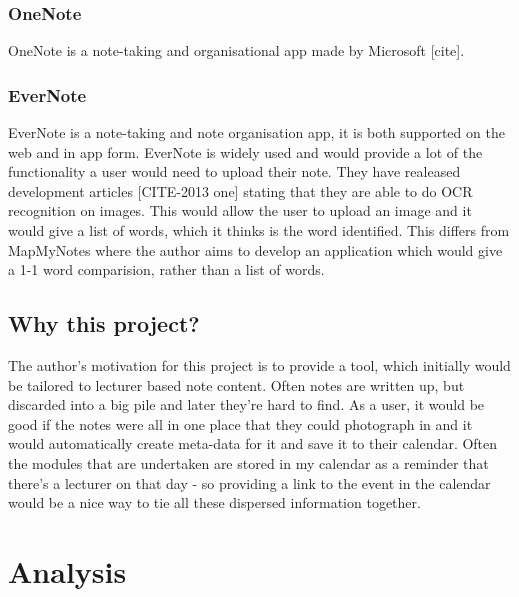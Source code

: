 \subsubsection{OneNote}
OneNote is a note-taking and organisational app made by Microsoft [cite].
\subsubsection{EverNote}
EverNote is a note-taking and note organisation app, it is both supported on the web and in app form. EverNote is widely used and would provide a lot of the functionality a user would need to upload their note. They have realeased development articles [CITE-2013 one] stating that they are able to do OCR recognition on images. This would allow the user to upload an image and it would give a list of words, which it thinks is the word identified. This differs from MapMyNotes where the author aims to develop an application which would give a 1-1 word comparision, rather than a list of words.


\subsection{Why this project?}
The author's motivation for this project is to provide a tool, which initially would be tailored to lecturer based note content. Often notes are written up, but discarded into a big pile and later they're hard to find. As a user, it would be good if the notes were all in one place that they could photograph in and it would automatically create meta-data for it and save it to their calendar. Often the modules that are undertaken are stored in my calendar as a reminder that there's a lecturer on that day - so providing a link to the event in the calendar would be a nice way to tie all these dispersed information together. 

\section{Analysis}


